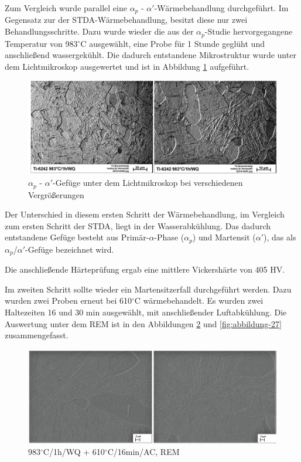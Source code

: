 Zum Vergleich wurde parallel eine $\alpha_p$ - $\alpha'$-Wärmebehandlung durchgeführt. Im Gegensatz zur der STDA-Wärmebehandlung, besitzt diese nur zwei Behandlungsschritte.
Dazu wurde wieder die aus der $\alpha_p$-Studie hervorgegangene Temperatur von 983$^\circ$C ausgewählt, eine Probe für 1 Stunde geglüht und anschließend wassergekühlt. Die dadurch entstandene Mikrostruktur wurde unter dem Lichtmikroskop ausgewertet und ist in Abbildung \ref{fig:abbildung-19} aufgeführt.

\begin{figure}
	\centering
	\includegraphics[width=1.0\linewidth]{./Bilder/Abbildung 19.png}
	\caption[Abbildung 19]{$\alpha_p$ - $\alpha'$-Gefüge unter dem Lichtmikroskop bei verschiedenen Vergrößerungen}
	\label{fig:abbildung-19}
\end{figure}

Der Unterschied in diesem ersten Schritt der Wärmebehandlung, im Vergleich zum ersten Schritt der STDA, liegt in der Wasserabkühlung. Das dadurch entstandene Gefüge besteht aus Primär-$\alpha$-Phase ($\alpha_p$) und Martensit ($\alpha'$), das als $\alpha_p$/$\alpha'$-Gefüge bezeichnet wird.

Die anschließende Härteprüfung ergab eine mittlere Vickershärte von 405 HV.

Im zweiten Schritt sollte wieder ein Martensitzerfall durchgeführt werden. Dazu wurden zwei Proben erneut bei 610$^\circ$C wärmebehandelt. Es wurden zwei Haltezeiten 16 und 30 min ausgewählt, mit anschließender Luftabkühlung. Die Auswertung unter dem REM ist in den Abbildungen \ref{fig:abbildung-26} und \ref{fig:abbildung-27} zusammengefasst.

\begin{figure}
	\centering
	\includegraphics[width=1.0\linewidth]{./Bilder/Abbildung 26.png}
	\caption[Abbildung 26]{983$^\circ$C/1h/WQ + 610$^\circ$C/16min/AC, REM}
	\label{fig:abbildung-26}
\end{figure}


